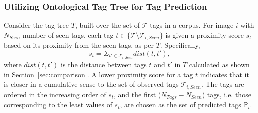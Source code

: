 \subsubsection{Utilizing Ontological Tag Tree for Tag Prediction} 
\label{sec:TagPredUsingGraph}
Consider the tag tree $T$, built over the set of $\mathcal{T}$ tags in a corpus. For image $i$ with $N_{Seen}$ number of seen tags, each tag $t \in \{ \mathcal{T} \setminus \mathcal{T}_{i,Seen} \}$ is given a proximity score $s_t$ based on its proximity from the seen tags, as per $T$. Specifically, 
\begin{equation} 
s_t = \Sigma_{t' \in \mathcal{T}_{i,Seen} }{dist(t,t')}, 
\label{eq:TPEquation}
\end{equation}
where $dist(t,t')$ is the distance between tags $t$ and $t'$ in $T$ calculated as shown in Section~\ref{sec:comparison}. A lower proximity score for a tag $t$ indicates that it is closer in a cumulative sense to the set of observed tags $\mathcal{T}_{i,Seen}$. The tags are ordered in the increasing order of $s_t$, and the first ($N_{Tags} - N_{Seen}$) tags, i.e. those corresponding to the least values of $s_t$, are chosen as the set of predicted tags $\mathbb{P}_i$. \\

